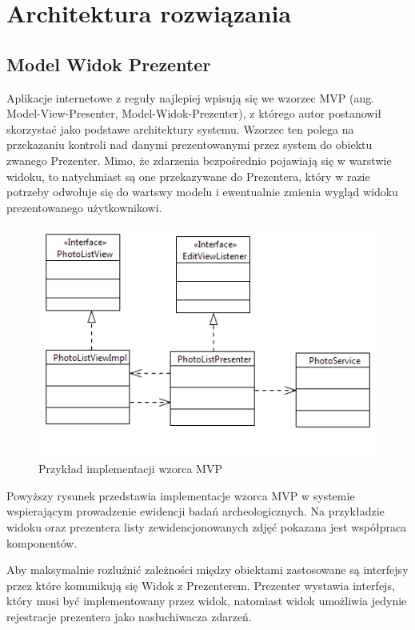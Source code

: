 \chapter{Architektura rozwiązania}
\section{Model Widok Prezenter}
Aplikacje internetowe z reguły najlepiej wpisują się we wzorzec MVP (ang. Model-View-Presenter, Model-Widok-Prezenter), z którego autor postanowił skorzystać jako podstawe architektury systemu. Wzorzec ten polega na przekazaniu kontroli nad danymi prezentowanymi przez system do obiektu zwanego Prezenter. Mimo, że zdarzenia bezpośrednio pojawiają się w warstwie widoku, to natychmiast są one przekazywane do Prezentera, który w razie potrzeby odwołuje się do wartswy modelu i ewentualnie zmienia wygląd widoku prezentowanego użytkownikowi.

\begin{figure} [H]
    \begin{center}
	\includegraphics[scale=.8]{img/mvp.png}
	\caption{Przykład implementacji wzorca MVP}
	\label{mvp}
    \end{center}
\end{figure}

Powyższy rysunek przedstawia implementacje wzorca MVP w systemie wspierającym prowadzenie ewidencji badań archeologicznych. Na przykładzie widoku oraz prezentera listy zewidencjonowanych zdjęć pokazana jest współpraca komponentów.

\newpage
Aby maksymalnie rozluźnić zależności między obiektami zastosowane są interfejsy przez które komunikują się Widok z Prezenterem. Prezenter wystawia interfejs, który musi być implementowany przez widok, natomiast widok umożliwia jedynie rejestracje prezentera jako nasłuchiwacza zdarzeń. 

